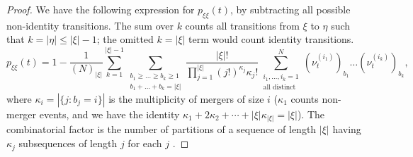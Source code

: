 \begin{proof}
We have the following expression for $p_{\xi\xi}(t)$, by subtracting all possible non-identity transitions. The sum over $k$ counts all transitions from $\xi$ to $\eta$ such that $k= |\eta| \leq |\xi|-1$; the omitted $k=|\xi|$ term would count identity transitions.
\begin{equation*}
p_{ \xi \xi }( t ) 
= 1 - \frac{ 1 }{ ( N )_{ | \xi | } } \sum_{ k = 1 }^{ | \xi | - 1 } 
        \sum_{ \substack{ b_1 \geq \ldots \geq b_k \geq 1 
        \\ b_1 + \ldots + b_k = | \xi | } } 
        \frac{ | \xi |! }{ \prod_{ j = 1 }^{ | \xi | } ( j ! )^{ \kappa_j } \kappa_j ! } 
        \sum_{ \substack{ i_1, \ldots, i_k = 1 \\ \text{all distinct} } }^N 
        ( \nu_t^{ ( i_1 ) } )_{ b_1 } \ldots ( \nu_t^{ ( i_k ) } )_{ b_k },
\end{equation*}
where $\kappa_i = |\{ j : b_j = i \}|$ is the multiplicity of mergers of size $i$ ($\kappa_1$ counts non-merger events, and we have the identity $\kappa_1 + 2 \kappa_2 + \cdots + | \xi | \kappa_{ | \xi | } = | \xi |$).
The combinatorial factor is the number of partitions of a sequence of length $|\xi|$  having $\kappa_j$ subsequences of length $j$ for each $j$ \parencite[Equation (11)]{fu2006}.


\end{proof}
